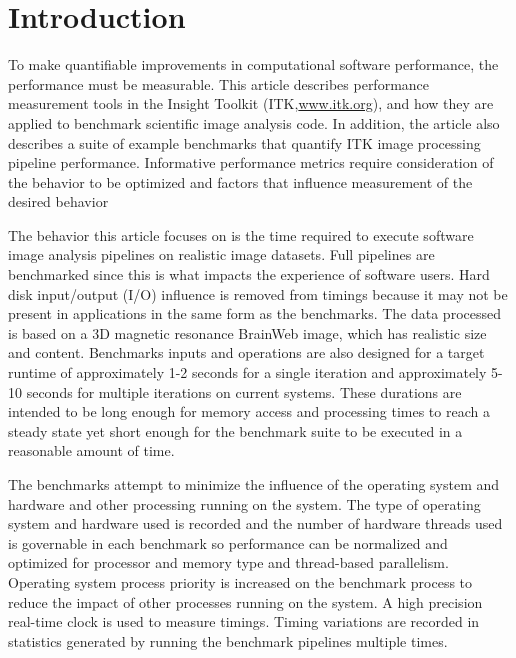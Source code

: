 \documentclass{InsightArticle}
\newcommand{\IJhandlerIDnumber}{1338}
\begin{document}
\IJhandlenote{\IJhandlerIDnumber}

\tableofcontents

\section{Introduction}

To make quantifiable improvements in computational software performance, the
performance must be measurable. This article describes performance
measurement tools in the Insight Toolkit (ITK,\url{www.itk.org}), and how they
are applied to benchmark scientific image analysis code. In addition, the
article also describes a suite of example benchmarks that quantify ITK image
processing pipeline performance. Informative performance metrics require
consideration of the behavior to be optimized and factors that influence
measurement of the desired behavior

The behavior this article focuses on is the time required to execute software
image analysis pipelines on realistic image datasets. Full pipelines are
benchmarked since this is what impacts the experience of software users. Hard
disk input/output (I/O) influence is removed from timings because it may not
be present in applications in the same form as the benchmarks. The data
processed is based on a 3D magnetic resonance
BrainWeb\cite{BrainWeb1,BrainWeb2} image, which has realistic size and
content. Benchmarks inputs and operations are also designed for a target
runtime of approximately 1-2 seconds for a single iteration and approximately
5-10 seconds for multiple iterations on current systems. These durations are
intended to be long enough for memory access and processing times to reach a
steady state yet short enough for the benchmark suite to be executed in a
reasonable amount of time.

The benchmarks attempt to minimize the influence of the operating system and
hardware and other processing running on the system. The type of operating
system and hardware used is recorded and the number of hardware threads used
is governable in each benchmark so performance can be normalized and optimized
for processor and memory type and thread-based parallelism. Operating system
process priority is increased on the benchmark process to reduce the impact of
other processes running on the system. A high precision real-time clock is
used to measure timings.  Timing variations are recorded in statistics
generated by running the benchmark pipelines multiple times.
\end{document}
